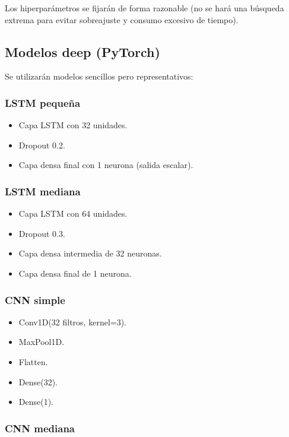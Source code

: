 \documentclass[12pt]{article}
\begin{document}
Los hiperparámetros se fijarán de forma razonable (no se hará una búsqueda extrema para evitar sobreajuste y consumo excesivo de tiempo).

\subsection{Modelos deep (PyTorch)}

Se utilizarán modelos sencillos pero representativos:

\subsubsection{LSTM pequeña}

\begin{itemize}
    \item Capa LSTM con 32 unidades.
    \item Dropout 0.2.
    \item Capa densa final con 1 neurona (salida escalar).
\end{itemize}

\subsubsection{LSTM mediana}

\begin{itemize}
    \item Capa LSTM con 64 unidades.
    \item Dropout 0.3.
    \item Capa densa intermedia de 32 neuronas.
    \item Capa densa final de 1 neurona.
\end{itemize}

\subsubsection{CNN simple}

\begin{itemize}
    \item Conv1D(32 filtros, kernel=3).
    \item MaxPool1D.
    \item Flatten.
    \item Dense(32).
    \item Dense(1).
\end{itemize}

\subsubsection{CNN mediana}
\end{document}

